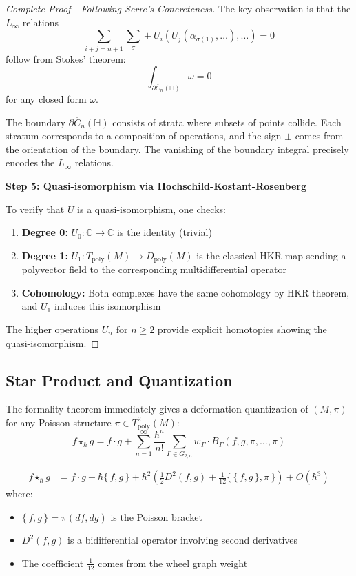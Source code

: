 \begin{proof}[Complete Proof - Following Serre's Concreteness]
The key observation is that the $L_\infty$ relations
$$\sum_{i+j=n+1} \sum_{\sigma} \pm U_i(U_j(\alpha_{\sigma(1)}, \ldots), \ldots) = 0$$
follow from Stokes' theorem:
$$\int_{\partial \overline{C}_n(\mathbb{H})} \omega = 0$$
for any closed form $\omega$.

The boundary $\partial \overline{C}_n(\mathbb{H})$ consists of strata where subsets of points collide. Each stratum corresponds to a composition of operations, and the sign $\pm$ comes from the orientation of the boundary. The vanishing of the boundary integral precisely encodes the $L_\infty$ relations.

\textbf{Step 5: Quasi-isomorphism via Hochschild-Kostant-Rosenberg}

To verify that $U$ is a quasi-isomorphism, one checks:
\begin{enumerate}
\item \textbf{Degree 0:} $U_0: \mathbb{C} \to \mathbb{C}$ is the identity (trivial)
\item \textbf{Degree 1:} $U_1: T_{\text{poly}}(M) \to D_{\text{poly}}(M)$ is the classical HKR map sending a polyvector field to the corresponding multidifferential operator
\item \textbf{Cohomology:} Both complexes have the same cohomology by HKR theorem, and $U_1$ induces this isomorphism
\end{enumerate}

The higher operations $U_n$ for $n \geq 2$ provide explicit homotopies showing the quasi-isomorphism.
\end{proof}

\subsection{Star Product and Quantization}

The formality theorem immediately gives a deformation quantization of $(M, \pi)$ for any Poisson structure $\pi \in T_{\text{poly}}^2(M)$:
$$f \star_\hbar g = f \cdot g + \sum_{n=1}^\infty \frac{\hbar^n}{n!} \sum_{\Gamma \in G_{2,n}} w_\Gamma \cdot B_\Gamma(f, g, \pi, \ldots, \pi)$$

\begin{example}
\begin{align}
f \star_\hbar g &= f \cdot g + \hbar \{\,f, g\,\} + \hbar^2 \left(\frac{1}{2}D^2(f,g) + \frac{1}{12} \{\,\{\,f,g\,\}, \pi\,\}\right) + O(\hbar^3)
\end{align}
where:
\begin{itemize}
\item $\{\,f,g\,\} = \pi(df, dg)$ is the Poisson bracket
\item $D^2(f,g)$ is a bidifferential operator involving second derivatives
\item The coefficient $\frac{1}{12}$ comes from the wheel graph weight
\end{itemize}
\end{example}

